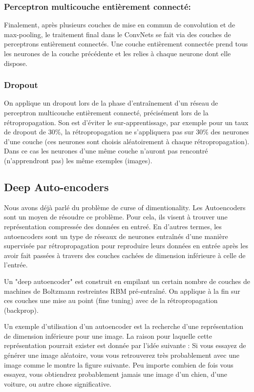 \subsubsection{Perceptron multicouche entièrement connecté:}

Finalement, après plusieurs couches de mise en commun de convolution et de max-pooling, le traitement final dans le ConvNets se fait via des couches de perceptrons entièrement connectés. Une couche entièrement connectée prend tous les neurones de la couche précédente et les relies à chaque neurone dont elle dispose.

\subsubsection{Dropout}
On applique un dropout lors de la phase d'entraînement d'un réseau de perceptron  multicouche entièrement connecté, précisément lors de la rétropropagation. Son est d'éviter le sur-apprentissage, par exemple pour un taux de dropout de 30\%, la rétropropagation ne s'appliquera pas sur 30\% des neurones d'une couche (ces neurones sont choisis aléatoirement à chaque rétropropagation). Dans ce cas les neurones d'une même couche n'auront pas rencontré (n'apprendront pas) les même exemples (images).

\subsection{Deep Auto-encoders}

Nous avons déjà parlé du problème de curse of dimentionality. Les Autoencoders sont un moyen de résoudre ce problème. Pour cela, ils visent à trouver une représentation compressée des données en entreé.
En d'autres termes, les autoencoders sont un type de réseaux de neurones entraînés d'une manière supervisée par rétropropagation pour reproduire leurs données en entrée après les avoir fait passées à travers des couches cachées de dimension inférieure à celle de l'entrée.


Un "deep autoencoder" est construit en empilant un certain nombre de couches de machines de Boltzmann restreintes RBM pré-entraîné. On applique à la fin sur ces couches une mise au point (fine tuning) avec de la rétropropagation (backprop).

Un exemple d'utilisation d'un autoencoder est la recherche d'une représentation de dimension inférieure pour une image. La raison pour laquelle cette représentation pourrait exister est donnée par l'idée suivante :
Si vous essayez de générer une image aléatoire, vous vous  retrouverez très probablement avec une image comme le montre la figure suivante. Peu importe combien de fois vous essayez, vous obtiendrez probablement jamais une image d'un chien, d'une voiture, ou autre chose significative.


